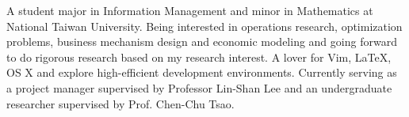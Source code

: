 

\begin{cvparagraph}

A student major in Information Management and minor in Mathematics at National Taiwan University. Being interested in operations research, optimization problems, business mechanism design and economic modeling and going forward to do rigorous research based on my research interest. A lover for Vim, \LaTeX, OS X and explore high-efficient development environments. Currently serving as a project manager supervised by Professor Lin-Shan Lee and an undergraduate researcher supervised by Prof. Chen-Chu Tsao.
\end{cvparagraph}
